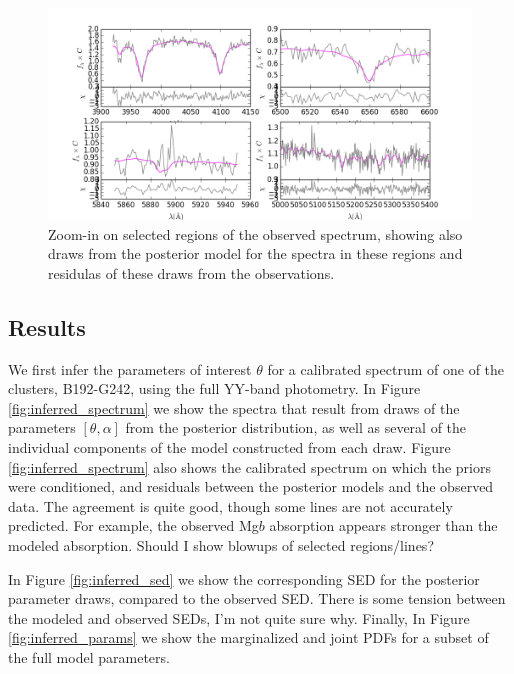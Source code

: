 \documentclass[iop,numberedappendix]{emulateapj}
\newcommand{\excluster}{B192-G242}
\begin{document}
\begin{figure}[h!]
\includegraphics[width=\textwidth]{figures/zfig_b192-g242_225_cal.png}
\caption{Zoom-in on selected regions of the observed spectrum, showing
also draws from the posterior model for the spectra in these regions
and residulas of these draws from the observations.
\label{fig:zoom_spectrum}}
\end{figure}

\subsection{Results}

We first infer the parameters of interest $\theta$ for a calibrated
spectrum of one of the clusters, \excluster, using the full YY-band
photometry. In Figure \ref{fig:inferred_spectrum} we show the spectra
that result from draws of the parameters $[\theta,\alpha]$ from the
posterior distribution, as well as several of the individual
components of the model constructed from each draw. Figure
\ref{fig:inferred_spectrum} also shows the calibrated spectrum on
which the priors were conditioned, and residuals between the posterior
models and the observed data.  The agreement is quite good, though
some lines are not accurately predicted.  For example, the observed
Mg$b$ absorption appears stronger than the modeled
absorption. {\color{blue} Should I show blowups of selected
regions/lines?}

In Figure \ref{fig:inferred_sed} we show the corresponding SED for the
posterior parameter draws, compared to the observed SED. There is some
tension between the modeled and observed SEDs, I'm not quite sure
why. Finally, In Figure \ref{fig:inferred_params} we show the
marginalized and joint PDFs for a subset of the full model parameters.
\end{document}
